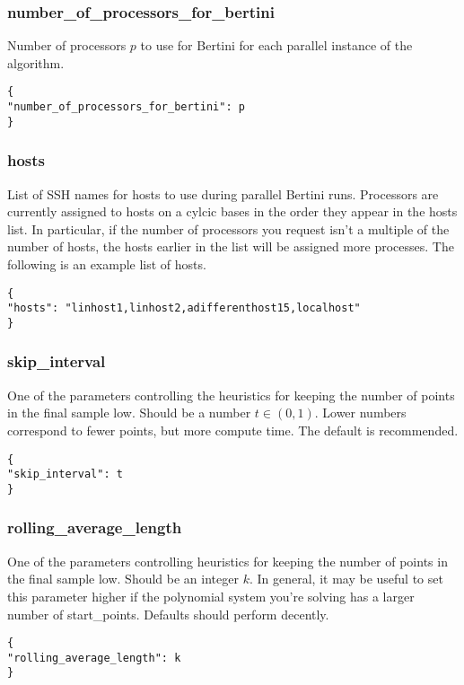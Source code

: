 \documentclass[11pt]{article}
\begin{document}
\subsubsection{number\_of\_processors\_for\_bertini}
Number of processors $p$ to use for Bertini for each parallel instance of the algorithm. 

\begin{verbatim}
{ 
"number_of_processors_for_bertini": p
}
\end{verbatim} 

\subsubsection{hosts} 
List of SSH names for hosts to use during parallel Bertini runs. Processors are currently assigned to hosts on a cylcic bases in the order they appear in the hosts list. In particular, if the number of processors you request isn't a multiple of the number of hosts, the hosts earlier in the list will be assigned more processes. The following is an example list of hosts.

\begin{verbatim}
{ 
"hosts": "linhost1,linhost2,adifferenthost15,localhost"
}
\end{verbatim}  

\subsubsection{skip\_interval} 
One of the parameters controlling the heuristics for keeping the number of points in the final sample low. Should be a number $t \in (0,1)$. Lower numbers correspond to fewer points, but more compute time. The default is recommended.

\begin{verbatim}
{ 
"skip_interval": t
}
\end{verbatim} 

\subsubsection{rolling\_average\_length} 
One of the parameters controlling heuristics for keeping the number of points in the final sample low. Should be an integer $k$. In general, it may be useful to set this parameter higher if the polynomial system you're solving has a larger number of start\_points. Defaults should perform decently.

\begin{verbatim}
{ 
"rolling_average_length": k
}
\end{verbatim} 
\end{document}
